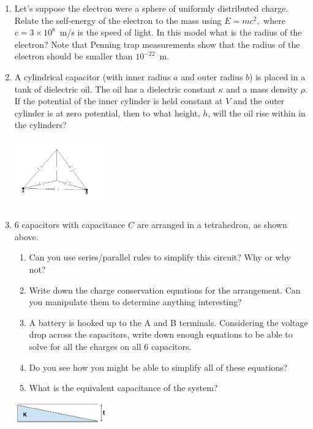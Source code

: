 \documentclass[12pt]{book}
\begin{document}
\begin{enumerate}
\item Let's suppose the electron were a sphere of uniformly distributed charge. Relate the self-energy of the electron to the mass using $E=mc^2,$ where $c = 3\times10^{8}$~m/s is the speed of light. In this model what is the radius of the electron? Note that Penning trap measurements show that the radius of the electron should be smaller than $10^{-22}$~m.
 \item A cylindrical capacitor (with inner radius $a$ and outer radius $b$) is placed in a tank of dielectric oil. The oil has a dielectric constant $\kappa$ and a mass density $\rho$. If the potential of the inner cylinder is held constant at $V$ and the outer cylinder is at zero potential, then to what height, $h$, will the oil rise within in the cylinders?
 
  \begin{center}
  \includegraphics[width=150px]{Tetrahedron.JPG}
 \end{center}
 
 \item 6 capacitors with capacitance $C$ are arranged in a tetrahedron, as shown above.
 \begin{enumerate}
  \item Can you use series/parallel rules to simplify this circuit? Why or why not?
  \item Write down the charge conservation equations for the arrangement. Can you manipulate them to determine anything interesting?
  \item A battery is hooked up to the A and B terminals. Considering the voltage drop across the capacitors, write down enough equations to be able to solve for all the charges on all 6 capacitors.
  \item Do you see how you might be able to simplify all of these equations?
  \item What is the equivalent capacitance of the system?
 \end{enumerate}
 
 \pagebreak
 
  \begin{center}
  \includegraphics[width=150px]{CapacitorDrawing.png}
 \end{center}


\end{enumerate}
\end{document}
